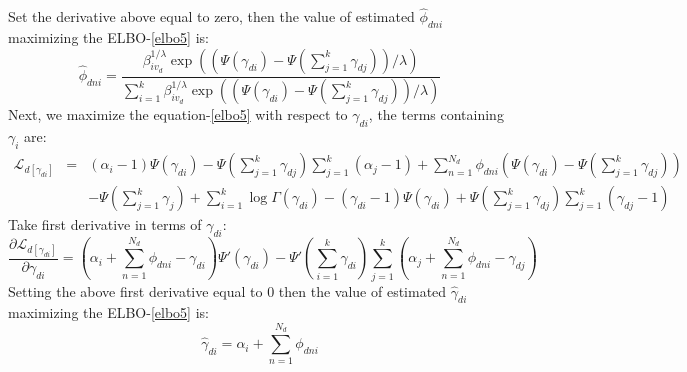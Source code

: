 \documentclass{article}
\newcommand{\be}{\begin{equation}}
\newcommand{\ee}{\end{equation}}
\newcommand{\ba}{\begin{array}}
\newcommand{\ea}{\end{array}}
\newcommand{\Sum}{\displaystyle\sum}
\begin{document}
Set the derivative above equal to zero, then the value of estimated $\hat{\phi}_{dni}$ maximizing the ELBO-\ref{elbo5} is:\\
\[
\hat{\phi}_{dni}=\frac{\beta_{iv_d}^{1/\lambda}\exp((\Psi(\gamma_{di})-\Psi(\sum_{j=1}^{k}\gamma_{dj}))/\lambda)}{\sum_{i=1}^{k}\beta_{iv_d}^{1/\lambda}\exp((\Psi(\gamma_{di})-\Psi(\sum_{j=1}^{k}\gamma_{dj}))/\lambda)}
\]
Next, we maximize the equation-\ref{elbo5} with respect to $\gamma_{di}$, the terms containing $\gamma_i$ are:\\
\be\label{elbo6}
\ba{rcl}
\mathcal{L}_{d[\gamma_{di}]}&=&(\alpha_i-1)\Psi(\gamma_{di})-\Psi(\sum_{j=1}^{k}\gamma_{dj})\Sum_{j=1}^{k}(\alpha_j-1)+\Sum_{n=1}^{N_d}\phi_{dni}(\Psi(\gamma_{di})-\Psi(\sum_{j=1}^{k}\gamma_{dj}))\\
&&-\Psi(\sum_{j=1}^{k}\gamma_j)+\Sum_{i=1}^{k}\log\Gamma(\gamma_{di})-(\gamma_{di}-1)\Psi(\gamma_{di})+\Psi(\sum_{j=1}^{k}\gamma_{dj})\Sum_{j=1}^{k}(\gamma_{dj}-1)
\ea
\ee
Take first derivative in terms of $\gamma_{di}$:
\[
\frac{\partial \mathcal{L}_{d[\gamma_{di}]}}{\partial \gamma_{di} }=(\alpha_i+\sum_{n=1}^{N_d}\phi_{dni}-\gamma_{di})\Psi'(\gamma_{di})-\Psi'(\sum_{i=1}^{k}\gamma_{di})\Sum_{j=1}^{k}(\alpha_j+\sum_{n=1}^{N_d}\phi_{dni}-\gamma_{dj})
\]
Setting the above first derivative equal to 0 then the value of estimated $\hat{\gamma}_{di}$ maximizing the ELBO-\ref{elbo5} is:\\
\[
\hat{\gamma}_{di}=\alpha_i+\sum_{n=1}^{N_d}\phi_{dni}
\]
\end{document}
